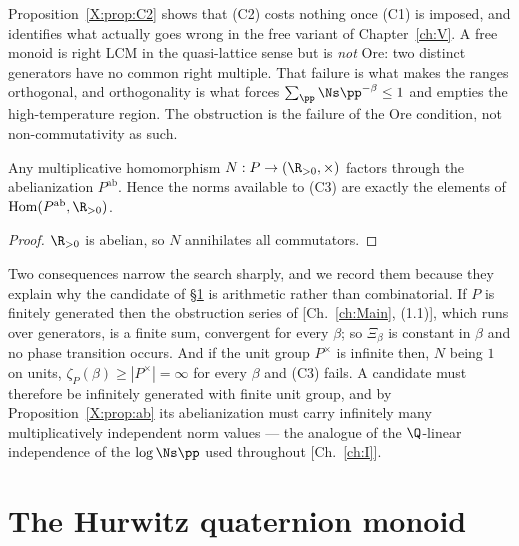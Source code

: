 \begin{remark}\label{X:rem:free}
Proposition~\ref{X:prop:C2} shows that (C2) costs nothing once (C1) is imposed, and identifies
what actually goes wrong in the free variant of Chapter~\ref{ch:V}. A free monoid is right LCM in the
quasi-lattice sense \cite{Nica} but is \emph{not} Ore: two distinct generators have no common right multiple. That
failure is what makes the ranges orthogonal, and orthogonality is what forces
$\sum_\pp\Ns\pp^{-\beta}\le1$ and empties the high-temperature region. The obstruction is the
failure of the Ore condition, not non-commutativity as such.
\end{remark}

\begin{proposition}\label{X:prop:ab}
Any multiplicative homomorphism $N:P\to(\R_{>0},\times)$ factors through the abelianization
$P^{\mathrm{ab}}$. Hence the norms available to (C3) are exactly the elements of
$\operatorname{Hom}(P^{\mathrm{ab}},\R_{>0})$.
\end{proposition}

\begin{proof}
$\R_{>0}$ is abelian, so $N$ annihilates all commutators.
\end{proof}

\begin{remark}\label{X:rem:selection}
Two consequences narrow the search sharply, and we record them because they explain why the
candidate of \S\ref{X:sec:hurwitz} is arithmetic rather than combinatorial. If $P$ is finitely
generated then the obstruction series of [Ch.~\ref{ch:Main}, (1.1)], which runs over generators, is a
finite sum, convergent for every $\beta$; so $\Xi_\beta$ is constant in $\beta$ and no phase
transition occurs. And if the unit group $P^\times$ is infinite then, $N$ being $1$ on units,
$\zeta_P(\beta)\ge|P^\times|=\infty$ for every $\beta$ and (C3) fails. A candidate must
therefore be infinitely generated with finite unit group, and by
Proposition~\ref{X:prop:ab} its abelianization must carry infinitely many multiplicatively
independent norm values --- the analogue of the $\Q$-linear independence of the $\log\Ns\pp$
used throughout [Ch.~\ref{ch:I}].
\end{remark}

\section{The Hurwitz quaternion monoid}\label{X:sec:hurwitz}

